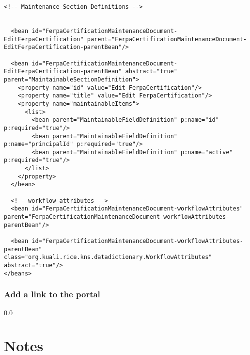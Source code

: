\begin{verbatim}
<!-- Maintenance Section Definitions -->


  <bean id="FerpaCertificationMaintenanceDocument-EditFerpaCertification" parent="FerpaCertificationMaintenanceDocument-EditFerpaCertification-parentBean"/>

  <bean id="FerpaCertificationMaintenanceDocument-EditFerpaCertification-parentBean" abstract="true" parent="MaintainableSectionDefinition">
    <property name="id" value="Edit FerpaCertification"/>
    <property name="title" value="Edit FerpaCertification"/>
    <property name="maintainableItems">
      <list>
        <bean parent="MaintainableFieldDefinition" p:name="id" p:required="true"/>
        <bean parent="MaintainableFieldDefinition" p:name="principalId" p:required="true"/>
        <bean parent="MaintainableFieldDefinition" p:name="active" p:required="true"/>
      </list>
    </property>
  </bean>
  
  <!-- workflow attributes -->
  <bean id="FerpaCertificationMaintenanceDocument-workflowAttributes" parent="FerpaCertificationMaintenanceDocument-workflowAttributes-parentBean"/>
  
  <bean id="FerpaCertificationMaintenanceDocument-workflowAttributes-parentBean" class="org.kuali.rice.kns.datadictionary.WorkflowAttributes" abstract="true"/>
</beans>\end{verbatim}

\subsubsection*{Add a link to the portal}

\newpage
{\setlength{\baselineskip}%
  {0.0\baselineskip}
  \section*{Notes}
  \hrulefill \par}